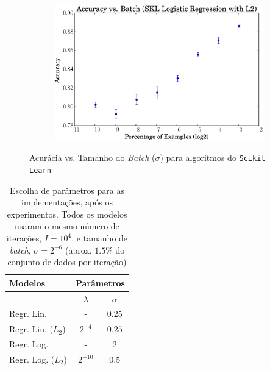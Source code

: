 \documentclass[a4paper, 12pt]{article}
\begin{document}
\begin{figure}[htpb]
\begin{subfigure}[htpb]{0.45\textwidth}
        \includegraphics[width=\textwidth]{acc_vs_batchp_skl_logregL2}
        \caption{}
        \label{fig:batch_skl_logregL2}
    \end{subfigure}
    \caption{Acurácia vs. Tamanho do \textit{Batch} ($\sigma$)
    para algoritmos do \texttt{Scikit Learn}}\label{fig:batch_skl}
\end{figure}

\begin{table}[htpb]
    \centering
    \begin{tabular}{@{}lcc@{}}
        \textbf{Modelos} & \multicolumn{2}{c}{\textbf{Parâmetros}} \\ \toprule
        & $\lambda$ & $\alpha$ \\ \midrule
        Regr. Lin. & - & $0.25$ \\
        Regr. Lin. ($L_2$) & $2^{-4}$ & $0.25 $       \\
        Regr. Log. & - & $2$ \\
        Regr. Log. ($L_2$) & $2^{-10}$ & $0.5$ \\ \bottomrule
    \end{tabular}
    \caption{Escolha de parâmetros para as implementações, após os
    experimentos. Todos os modelos usaram o mesmo número de iterações,
    $I = 10^{4}$, e tamanho de \textit{batch}, $\sigma = 2^{-6}$ (aprox.
    $1.5\%$ do conjunto de dados por iteração)}
    \label{tab:par}
\end{table}
\end{document}
